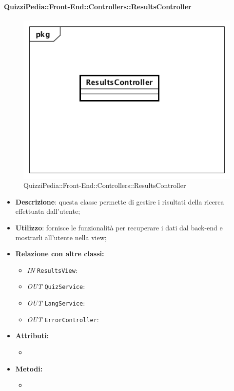\paragraph{QuizziPedia::Front-End::Controllers::ResultsController}
\begin{figure}
	\centering
	\includegraphics[scale=0.45]{UML/Classi/Front-End/QuizziPedia_Front-end_Controller_ResultsController.png}
	\caption{QuizziPedia::Front-End::Controllers::ResultsController}
\end{figure}
\begin{itemize}
	\item \textbf{Descrizione}: questa classe permette di gestire i risultati della ricerca effettuata dall'utente;
	\item \textbf{Utilizzo}: fornisce le funzionalità per recuperare i dati dal back-end e mostrarli all'utente nella view;
	\item \textbf{Relazione con altre classi:}
	\begin{itemize}
		\item \textit{IN} \texttt{ResultsView}: 
		\item \textit{OUT} \texttt{QuizService}:
		\item \textit{OUT} \texttt{LangService}: 
		\item \textit{OUT} \texttt{ErrorController}: 
	\end{itemize}
	\item \textbf{Attributi:}
	\begin{itemize}
		\item 
	\end{itemize}
	\item \textbf{Metodi:}
	\begin{itemize}
		\item 
	\end{itemize}
\end{itemize}

